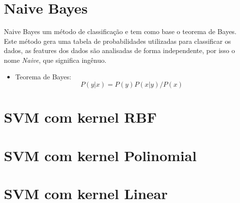 \section{Naive Bayes}

Naive Bayes um método de classificação e tem como base o teorema de Bayes. Este método
gera uma tabela de probabilidades utilizadas para classificar os dados, as features dos 
dados são analisadas de forma independente, por isso o nome \textit{Naive}, que significa
ingênuo.

\begin{itemize}
    \item Teorema de Bayes:
    \begin{equation}
        P(y|x) = P(y)P(x|y)/P(x)
        \label{eq:mass_energy_equation}
    \end{equation}

\end{itemize}



\section{SVM com kernel RBF}



\section{SVM com kernel Polinomial}

\section{SVM com kernel Linear}
